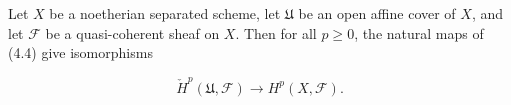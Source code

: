 Let $X$ be a noetherian separated scheme, let $\mathfrak{U}$ be an open affine cover of $X$, and let $\mathcal{F}$ be a quasi-coherent sheaf on $X$. Then for all $p \geq 0$, the natural maps of (4.4) give isomorphisms

$$\check{H}^p(\mathfrak{U}, \mathcal{F}) \rightarrow H^p(X, \mathcal{F}).$$
